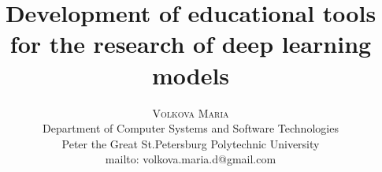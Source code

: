 \title{Development of educational tools for the research of deep learning models} %
\author{%
\textsc{Volkova Maria} \\ %
\normalsize Department of Computer Systems and Software Technologies \\
\normalsize Peter the Great St.Petersburg Polytechnic University \\ %
\normalsize {mailto: volkova.maria.d@gmail.com} %
}
\date{}